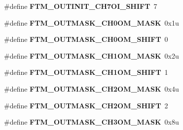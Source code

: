 \begin{DoxyCompactItemize}
\item 
\hypertarget{group___f_t_m___register___masks_ga717e3d932a491d96e6d729ff87e7c0dd}{}\#define {\bfseries F\+T\+M\+\_\+\+O\+U\+T\+I\+N\+I\+T\+\_\+\+C\+H7\+O\+I\+\_\+\+S\+H\+I\+F\+T}~7\label{group___f_t_m___register___masks_ga717e3d932a491d96e6d729ff87e7c0dd}

\item 
\hypertarget{group___f_t_m___register___masks_gae1ed080952e4ddf3947066d5d97b7920}{}\#define {\bfseries F\+T\+M\+\_\+\+O\+U\+T\+M\+A\+S\+K\+\_\+\+C\+H0\+O\+M\+\_\+\+M\+A\+S\+K}~0x1u\label{group___f_t_m___register___masks_gae1ed080952e4ddf3947066d5d97b7920}

\item 
\hypertarget{group___f_t_m___register___masks_gaae1f8ee6cad97accdeef238387cd160c}{}\#define {\bfseries F\+T\+M\+\_\+\+O\+U\+T\+M\+A\+S\+K\+\_\+\+C\+H0\+O\+M\+\_\+\+S\+H\+I\+F\+T}~0\label{group___f_t_m___register___masks_gaae1f8ee6cad97accdeef238387cd160c}

\item 
\hypertarget{group___f_t_m___register___masks_gaddee400c7d6e8dca5d318526d6e9cf0c}{}\#define {\bfseries F\+T\+M\+\_\+\+O\+U\+T\+M\+A\+S\+K\+\_\+\+C\+H1\+O\+M\+\_\+\+M\+A\+S\+K}~0x2u\label{group___f_t_m___register___masks_gaddee400c7d6e8dca5d318526d6e9cf0c}

\item 
\hypertarget{group___f_t_m___register___masks_ga50e5211e18cdbae9c986b49e5ff919f8}{}\#define {\bfseries F\+T\+M\+\_\+\+O\+U\+T\+M\+A\+S\+K\+\_\+\+C\+H1\+O\+M\+\_\+\+S\+H\+I\+F\+T}~1\label{group___f_t_m___register___masks_ga50e5211e18cdbae9c986b49e5ff919f8}

\item 
\hypertarget{group___f_t_m___register___masks_gabcfafbb8acba84e561a6023f966991c8}{}\#define {\bfseries F\+T\+M\+\_\+\+O\+U\+T\+M\+A\+S\+K\+\_\+\+C\+H2\+O\+M\+\_\+\+M\+A\+S\+K}~0x4u\label{group___f_t_m___register___masks_gabcfafbb8acba84e561a6023f966991c8}

\item 
\hypertarget{group___f_t_m___register___masks_ga9dca78158dd0cbc591569935f052bab4}{}\#define {\bfseries F\+T\+M\+\_\+\+O\+U\+T\+M\+A\+S\+K\+\_\+\+C\+H2\+O\+M\+\_\+\+S\+H\+I\+F\+T}~2\label{group___f_t_m___register___masks_ga9dca78158dd0cbc591569935f052bab4}

\item 
\hypertarget{group___f_t_m___register___masks_gae6021cca5706f19ca601ca8d020c4903}{}\#define {\bfseries F\+T\+M\+\_\+\+O\+U\+T\+M\+A\+S\+K\+\_\+\+C\+H3\+O\+M\+\_\+\+M\+A\+S\+K}~0x8u\label{group___f_t_m___register___masks_gae6021cca5706f19ca601ca8d020c4903}


\end{DoxyCompactItemize}
